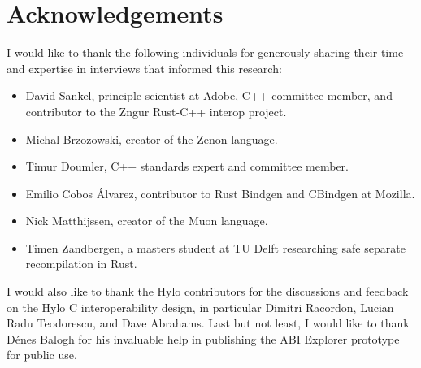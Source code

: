 \section*{Acknowledgements}
I would like to thank the following individuals for generously sharing their time and expertise in interviews that informed this research:
\begin{itemize}
    \item David Sankel, principle scientist at Adobe, C++ committee member, and contributor to the Zngur Rust-C++ interop project\cite{zngur}.
    \item Michal Brzozowski, creator of the Zenon language\cite{zenon-lang}.
    \item Timur Doumler, C++ standards expert and committee member.
    \item Emilio Cobos Álvarez, contributor to Rust Bindgen\cite{rust-bindgen} and CBindgen\cite{cbindgen} at Mozilla.
    \item Nick Matthijssen, creator of the Muon language.
    \item Timen Zandbergen, a masters student at TU Delft researching safe separate recompilation in Rust.
\end{itemize} 
I would also like to thank the Hylo contributors for the discussions and feedback on the Hylo C interoperability design, in particular Dimitri Racordon, Lucian Radu Teodorescu, and Dave Abrahams. Last but not least, I would like to thank Dénes Balogh for his invaluable help in publishing the ABI Explorer prototype for public use\cite{abi-explorer}.